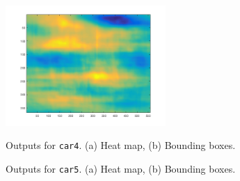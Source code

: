 \documentclass{assignment}
\begin{document}
\begin{problemlist}
\begin{figure}[H]
\begin{center}
{            \label{fig:4_3car4_subfig:a}
            \includegraphics[height = 1.8in]{4_3car4_heat_map}}
        \hspace{0.5cm}
        \caption{Outputs for \texttt{car4}. (a) Heat map, (b) Bounding boxes.}
        \label{fig:4_3car4_images}
    \end{center}
\end{figure}
\begin{figure}[H]
    \begin{center}
        \hspace{0.5cm}
        \caption{Outputs for \texttt{car5}. (a) Heat map, (b) Bounding boxes.}
        \label{fig:4_3car5_images}
    \end{center}
\end{figure}


\end{problemlist}
\end{document}
